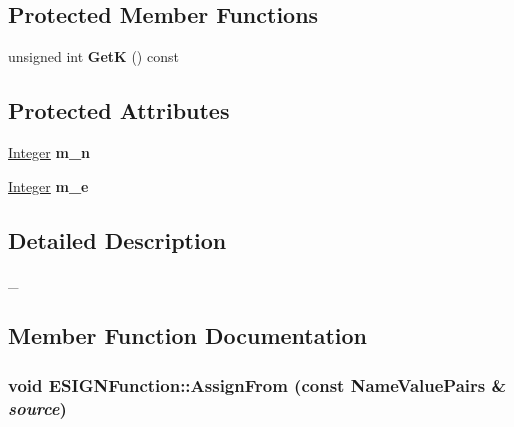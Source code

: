 \subsection*{Protected Member Functions}
\begin{DoxyCompactItemize}
\item 
\hypertarget{class_e_s_i_g_n_function_af9d44a6d961c90108431d959511e89dc}{
unsigned int {\bfseries GetK} () const }
\label{class_e_s_i_g_n_function_af9d44a6d961c90108431d959511e89dc}

\end{DoxyCompactItemize}
\subsection*{Protected Attributes}
\begin{DoxyCompactItemize}
\item 
\hypertarget{class_e_s_i_g_n_function_a74695389e40c412ff0a1e34ebb797678}{
\hyperlink{class_integer}{Integer} {\bfseries m\_\-n}}
\label{class_e_s_i_g_n_function_a74695389e40c412ff0a1e34ebb797678}

\item 
\hypertarget{class_e_s_i_g_n_function_a086e17e8047753768b22c6b59faebf60}{
\hyperlink{class_integer}{Integer} {\bfseries m\_\-e}}
\label{class_e_s_i_g_n_function_a086e17e8047753768b22c6b59faebf60}

\end{DoxyCompactItemize}


\subsection{Detailed Description}
\_\- 

\subsection{Member Function Documentation}
\hypertarget{class_e_s_i_g_n_function_a1ff8229ed7786a13a69d15e5a64e4d21}{
\subsubsection[{AssignFrom}]{\setlength{\rightskip}{0pt plus 5cm}void ESIGNFunction::AssignFrom (const {\bf NameValuePairs} \& {\em source})}}
\label{class_e_s_i_g_n_function_a1ff8229ed7786a13a69d15e5a64e4d21}



